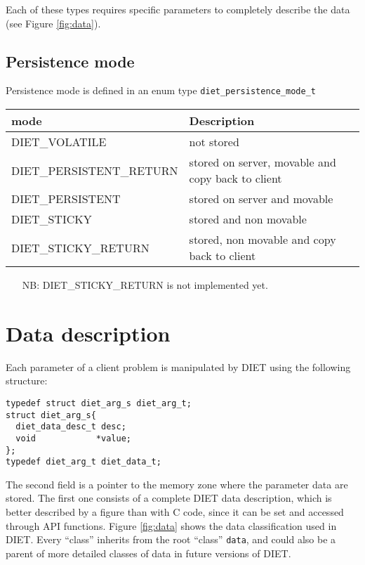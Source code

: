 Each of these types requires specific parameters to completely describe the
data (see Figure \ref{fig:data}).


\subsection{Persistence mode}
\label{ssec:persismode}
Persistence mode is defined in an enum type \texttt{diet\_persistence\_mode\_t}

\begin{center}
\footnotesize
\begin{tabular}{|l|l|}
\hline
\textbf{mode}&\textbf{Description}\\
\hline
\textsf{DIET\_VOLATILE} & not stored\\
\textsf{DIET\_PERSISTENT\_RETURN} & stored on server, movable and copy back to client\\
\textsf{DIET\_PERSISTENT} & stored on server and movable\\
\textsf{DIET\_STICKY} & stored and non movable\\
\hline\hline
\textsf{DIET\_STICKY\_RETURN} & stored, non movable and copy back to client\\
\hline
\end{tabular}
\end{center}

\begin{itemize}
\item[NB:] \textsf{DIET\_STICKY\_RETURN} is not implemented yet.
\end{itemize}

\section{Data description}
\label{sec:datadesc}

Each parameter of a client problem is manipulated by DIET using the following
structure:
{\footnotesize
\begin{verbatim}
typedef struct diet_arg_s diet_arg_t;
struct diet_arg_s{
  diet_data_desc_t desc;
  void            *value;
};
typedef diet_arg_t diet_data_t;
\end{verbatim}
}

The second field is a pointer to the memory zone where the parameter data are
stored. The first one consists of a complete DIET data description, which is
better described by a figure than with C code, since it can be set and accessed
through API functions. Figure \ref{fig:data} shows the data classification used
in DIET. Every ``class'' inherits from the root ``class'' \texttt{data}, and
could also be a parent of more detailed classes of data in future versions of
DIET.

